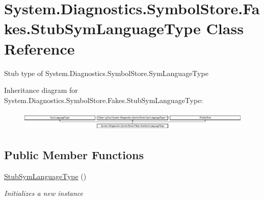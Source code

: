 \hypertarget{class_system_1_1_diagnostics_1_1_symbol_store_1_1_fakes_1_1_stub_sym_language_type}{\section{System.\-Diagnostics.\-Symbol\-Store.\-Fakes.\-Stub\-Sym\-Language\-Type Class Reference}
\label{class_system_1_1_diagnostics_1_1_symbol_store_1_1_fakes_1_1_stub_sym_language_type}
}


Stub type of System.\-Diagnostics.\-Symbol\-Store.\-Sym\-Language\-Type 


Inheritance diagram for System.\-Diagnostics.\-Symbol\-Store.\-Fakes.\-Stub\-Sym\-Language\-Type\-:\begin{figure}[H]
\begin{center}
\leavevmode
\includegraphics[height=0.919540cm]{class_system_1_1_diagnostics_1_1_symbol_store_1_1_fakes_1_1_stub_sym_language_type}
\end{center}
\end{figure}
\subsection*{Public Member Functions}
\begin{DoxyCompactItemize}
\item 
\hyperlink{class_system_1_1_diagnostics_1_1_symbol_store_1_1_fakes_1_1_stub_sym_language_type_a10a587edbbcc6c68c0df940a8023289b}{Stub\-Sym\-Language\-Type} ()
\begin{DoxyCompactList}\small\item\em Initializes a new instance\end{DoxyCompactList}\end{DoxyCompactItemize}
